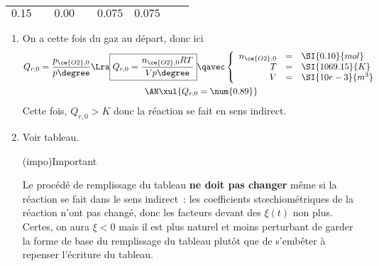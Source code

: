 \documentclass[../../main/main.tex]{subfiles}
\begin{document}
{\begin{center}
\begin{tabularx}{\linewidth}{|l|c||YdYdY||Y|}
			$\num{0.15}$         & \vline               &
			$\num{0.00}$         & \vline               &
			$\num{0.075}$        &
			$\num{0.075}$                                 \\
			\hline
		\end{tabularx}
	\end{center}
	\begin{enumerate}[leftmargin=20pt, label=\alph* --]
		\item On a cette fois du gaz au départ, donc ici
		      \begin{gather*}
			      Q_{r,0}
			      = \frac{p_{\ce{O2}, 0}}{p\degree}
            \Lra
            \boxed{
              Q_{r,0}
              = \frac{n_{\ce{O2}, 0}RT}{Vp\degree}
            }
			      \qavec
			      \left\{
			      \begin{array}{rcl}
				      n_{\ce{O2}, 0} & = & \SI{0.10}{mol}  \\
				      T              & = & \SI{1069.15}{K} \\
				      V              & = & \SI{10e-3}{m^3}
			      \end{array}
			      \right.\\
			      \AN
			      \xul{Q_{r,0} = \num{0.89}}
		      \end{gather*}
		      Cette fois, $Q_{r,0} > K$ donc la réaction se fait en sens
		      indirect.
		\item Voir tableau.
		      \begin{tcb}(impo){Important}

			      Le procédé de remplissage du tableau \textbf{ne doit pas changer}
			      même si la réaction se fait dans le sens indirect~: les coefficients
			      stœchiométriques de la réaction n'ont pas changé, donc les facteurs
			      devant des $\xi(t)$ non plus.
			      \smallbreak
			      Certes, on aura $\xi < 0$ mais il est plus naturel et moins
			      perturbant de garder la forme de base du remplissage du tableau
			      plutôt que de s'embêter à repenser l'écriture du tableau.


\end{tcb}
\end{enumerate}}
\end{document}

